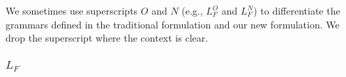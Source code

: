 We sometimes use superscripts $O$ and $N$ (e.g., $L_{F}^{O}$ and $L_{F}^{N}$) to differentiate the grammars defined in the traditional formulation and our new formulation. We drop the superscript where the context is clear. 


\subsubsection{$L_F$}
\label{subsubsec:newLF}



